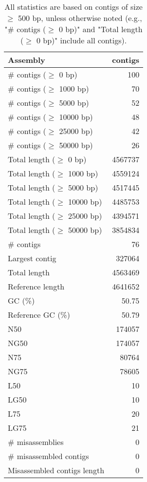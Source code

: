 \documentclass[12pt,a4paper]{article}
\begin{document}
\begin{table}[ht]
\begin{center}
\caption{All statistics are based on contigs of size $\geq$ 500 bp, unless otherwise noted (e.g., "\# contigs ($\geq$ 0 bp)" and "Total length ($\geq$ 0 bp)" include all contigs).}
\begin{tabular}{|l*{1}{|r}|}
\hline
Assembly & contigs \\ \hline
\# contigs ($\geq$ 0 bp) & 100 \\ \hline
\# contigs ($\geq$ 1000 bp) & 70 \\ \hline
\# contigs ($\geq$ 5000 bp) & 52 \\ \hline
\# contigs ($\geq$ 10000 bp) & 48 \\ \hline
\# contigs ($\geq$ 25000 bp) & 42 \\ \hline
\# contigs ($\geq$ 50000 bp) & 26 \\ \hline
Total length ($\geq$ 0 bp) & 4567737 \\ \hline
Total length ($\geq$ 1000 bp) & 4559124 \\ \hline
Total length ($\geq$ 5000 bp) & 4517445 \\ \hline
Total length ($\geq$ 10000 bp) & 4485753 \\ \hline
Total length ($\geq$ 25000 bp) & 4394571 \\ \hline
Total length ($\geq$ 50000 bp) & 3854834 \\ \hline
\# contigs & 76 \\ \hline
Largest contig & 327064 \\ \hline
Total length & 4563469 \\ \hline
Reference length & 4641652 \\ \hline
GC (\%) & 50.75 \\ \hline
Reference GC (\%) & 50.79 \\ \hline
N50 & 174057 \\ \hline
NG50 & 174057 \\ \hline
N75 & 80764 \\ \hline
NG75 & 78605 \\ \hline
L50 & 10 \\ \hline
LG50 & 10 \\ \hline
L75 & 20 \\ \hline
LG75 & 21 \\ \hline
\# misassemblies & 0 \\ \hline
\# misassembled contigs & 0 \\ \hline
Misassembled contigs length & 0 \\ \hline

\end{tabular}
\end{center}
\end{table}
\end{document}
